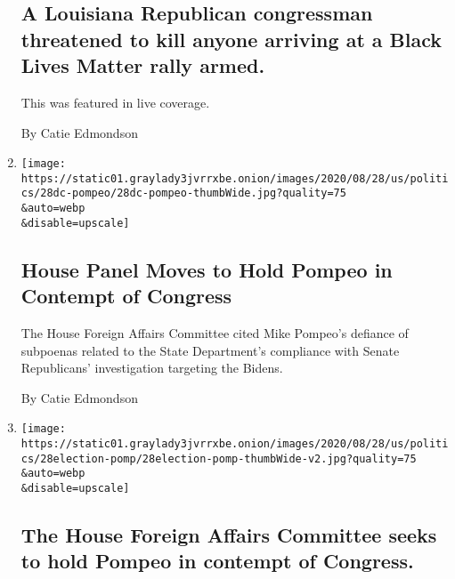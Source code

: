 \begin{enumerate}
  \hypertarget{a-louisiana-republican-congressman-threatened-to-kill-anyone-arriving-at-a-black-lives-matter-rally-armed}{%
  \subsection{A Louisiana Republican congressman threatened to kill
  anyone arriving at a Black Lives Matter rally
  armed.}\label{a-louisiana-republican-congressman-threatened-to-kill-anyone-arriving-at-a-black-lives-matter-rally-armed}}

  This was featured in live coverage.

  By Catie Edmondson
\item
  \href{/2020/08/28/us/politics/house-pompeo-contempt-of-congress.html}{}

  \texttt{[image: https://static01.graylady3jvrrxbe.onion/images/2020/08/28/us/politics/28dc-pompeo/28dc-pompeo-thumbWide.jpg?quality=75\\\&auto=webp\\\&disable=upscale]}

  \hypertarget{house-panel-moves-to-hold-pompeo-in-contempt-of-congress}{%
  \subsection{House Panel Moves to Hold Pompeo in Contempt of
  Congress}\label{house-panel-moves-to-hold-pompeo-in-contempt-of-congress}}

  The House Foreign Affairs Committee cited Mike Pompeo's defiance of
  subpoenas related to the State Department's compliance with Senate
  Republicans' investigation targeting the Bidens.

  By Catie Edmondson
\item
  \href{/live/2020/08/28/us/trump-vs-biden/the-house-foreign-affairs-committee-seeks-to-hold-pompeo-in-contempt-of-congress}{}

  \texttt{[image: https://static01.graylady3jvrrxbe.onion/images/2020/08/28/us/politics/28election-pomp/28election-pomp-thumbWide-v2.jpg?quality=75\\\&auto=webp\\\&disable=upscale]}

  \hypertarget{the-house-foreign-affairs-committee-seeks-to-hold-pompeo-in-contempt-of-congress}{%
  \subsection{The House Foreign Affairs Committee seeks to hold Pompeo
  in contempt of
  Congress.}\label{the-house-foreign-affairs-committee-seeks-to-hold-pompeo-in-contempt-of-congress}}


\end{enumerate}
